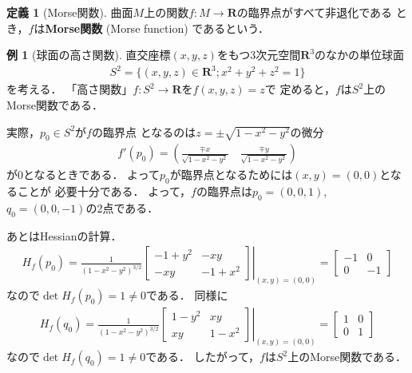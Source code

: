 \documentclass[11pt, a4paper, dvipdfmx]{jsarticle}
\theoremstyle{definition}
\newcommand{\rr}{\mathbf{R}}
\theoremstyle{mystyle}
\newtheorem{DFN}[Axiom]{定義}
\newtheorem{EG}[Axiom]{例}
\numberwithin{equation}{section} %
\begin{document}
\begin{DFN}[Morse関数]
    曲面$M$上の関数$f\colon M\to \rr$の臨界点がすべて非退化である
    とき，$f$は\textbf{Morse関数} (Morse function) であるという．
\end{DFN}

\begin{EG}[球面の高さ関数]
    直交座標$(x,y,z)$をもつ3次元空間$\rr^3$のなかの単位球面
    \begin{align}
        S^2=\{(x,y,z)\in\rr^3; x^2+y^2+z^2=1\}
    \end{align}
    を考える．
    「高さ関数」$f\colon S^2\to\rr$を$f(x,y,z)=z$で
    定めると，$f$は$S^2$上のMorse関数である．

    実際，$p_0\in S^2$が$f$の臨界点
    となるのは$z=\pm \sqrt{1-x^2-y^2}$の微分
    \begin{align*}
        f'(p_0)=\left(\frac{\mp x}{\sqrt{1-x^2-y^2}}\quad \frac{\mp y}{\sqrt{1-x^2-y^2}}\right)
    \end{align*}
    が0となるときである．
    よって$p_0$が臨界点となるためには$(x,y)=(0,0)$となることが
    必要十分である．
    よって，$f$の臨界点は$p_0=(0,0,1)$, $q_0=(0,0,-1)$の2点である．
    
    あとはHessianの計算．
    \begin{align*}
        H_f(p_0)=
        \frac{1}{(1-x^2-y^2)^{3/2}}
        \left.\begin{bmatrix*}
            -1+y^2 & -xy\\
            -xy & -1+x^2
        \end{bmatrix*}
        \right|_{(x,y)=(0,0)}
        =\begin{bmatrix*}
            -1&0\\0&-1
        \end{bmatrix*}
    \end{align*}
    なので$\det H_f(p_0)=1\neq 0$である．
    同様に
    \begin{align*}
        H_f(q_0)=
        \frac{1}{(1-x^2-y^2)^{3/2}}
        \left.\begin{bmatrix*}
            1-y^2 & xy\\
            xy & 1-x^2
        \end{bmatrix*}
        \right|_{(x,y)=(0,0)}
        =\begin{bmatrix*}
            1&0\\0&1
        \end{bmatrix*}
    \end{align*}
    なので$\det H_f(q_0)=1\neq 0$である．
    したがって，$f$は$S^2$上のMorse関数である．
\end{EG}
\end{document}
